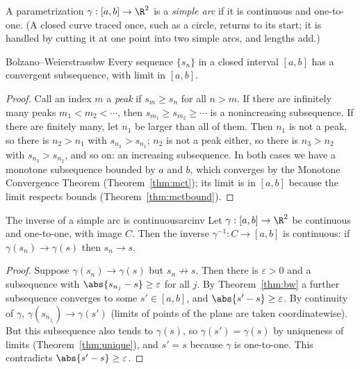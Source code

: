 \documentclass[11pt]{article}
\begin{document}
A parametrization $\gamma:[a,b]\to\R^2$ is a \emph{simple arc} if it is continuous and one-to-one. (A closed curve traced once, such as a circle, returns to its start; it is handled by cutting it at one point into two simple arcs, and lengths add.)

\begin{thm}{Bolzano--Weierstrass}{bw}
Every sequence $\{s_n\}$ in a closed interval $[a,b]$ has a convergent subsequence, with limit in $[a,b]$.
\end{thm}
\begin{proof}
Call an index $m$ a \emph{peak} if $s_m\ge s_n$ for all $n>m$. If there are infinitely many peaks $m_1<m_2<\cdots$, then $s_{m_1}\ge s_{m_2}\ge\cdots$ is a nonincreasing subsequence. If there are finitely many, let $n_1$ be larger than all of them. Then $n_1$ is not a peak, so there is $n_2>n_1$ with $s_{n_2}>s_{n_1}$; $n_2$ is not a peak either, so there is $n_3>n_2$ with $s_{n_3}>s_{n_2}$, and so on: an increasing subsequence. In both cases we have a monotone subsequence bounded by $a$ and $b$, which converges by the Monotone Convergence Theorem (Theorem~\ref{thm:mct}); its limit is in $[a,b]$ because the limit respects bounds (Theorem~\ref{thm:mctbound}).
\end{proof}

\begin{thm}{The inverse of a simple arc is continuous}{arcinv}
Let $\gamma:[a,b]\to\R^2$ be continuous and one-to-one, with image $C$. Then the inverse $\gamma^{-1}:C\to[a,b]$ is continuous: if $\gamma(s_n)\to\gamma(s)$ then $s_n\to s$.
\end{thm}
\begin{proof}
Suppose $\gamma(s_n)\to\gamma(s)$ but $s_n\not\to s$. Then there is $\varepsilon>0$ and a subsequence with $\abs{s_{n_j}-s}\ge\varepsilon$ for all $j$. By Theorem~\ref{thm:bw} a further subsequence converges to some $s'\in[a,b]$, and $\abs{s'-s}\ge\varepsilon$. By continuity of $\gamma$, $\gamma(s_{n_{j_i}})\to\gamma(s')$ (limits of points of the plane are taken coordinatewise). But this subsequence also tends to $\gamma(s)$, so $\gamma(s')=\gamma(s)$ by uniqueness of limits (Theorem~\ref{thm:unique}), and $s'=s$ because $\gamma$ is one-to-one. This contradicts $\abs{s'-s}\ge\varepsilon$.
\end{proof}
\end{document}

